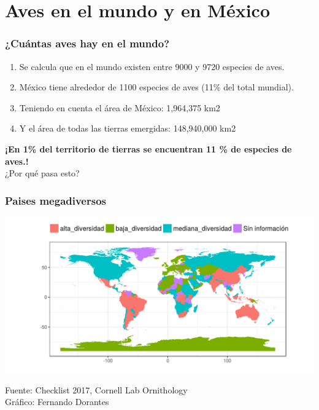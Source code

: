 \documentclass[compress]{beamer}
\begin{document}
\section{Aves en el mundo y en México}
  
{
  \begin{frame}
    \frametitle{¿Cuántas aves hay en el mundo?}
    
    \begin{enumerate}
     \item Se calcula que en el mundo existen entre 9000 y 9720 especies de aves.
     \item  México tiene alrededor de 1100 especies de aves (11\% del total mundial).
     \item Teniendo en cuenta el área  de México: 1,964,375 km2
     \item Y el área de todas las tierras emergidas: 148,940,000 km2
    \end{enumerate}       
    
    \begin{center}
     \textbf{¡En  1\% del territorio de tierras se encuentran 11 \% de especies de aves.!}\\
     ¿Por qué pasa esto?
    \end{center}

 \end{frame}
}

{
  \begin{frame}
    \frametitle{Paises megadiversos}
    \begin{center}
      \includegraphics[scale=0.5]{graficos/mapaAves.png}\\
    \end{center}
    \tiny{Fuente: Checklist 2017, Cornell Lab Ornithology}\\
    \tiny{Gráfico: Fernando Dorantes}
 \end{frame}
}
\end{document}
